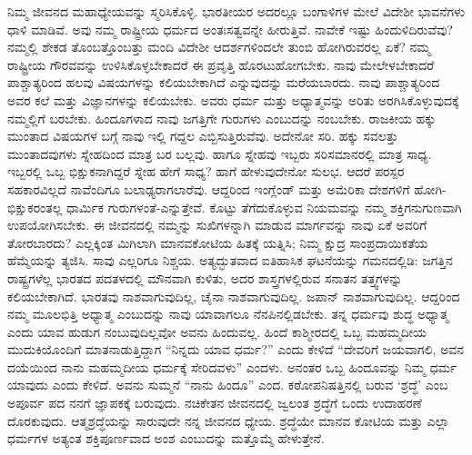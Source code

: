 ನಿಮ್ಮ ಜೀವನದ ಮಹಾಧ್ಯೇಯವನ್ನು ಸ್ಮರಿಸಿಕೊಳ್ಳಿ. ಭಾರತೀಯರ ಅದರಲ್ಲೂ ಬಂಗಾಳಿಗಳ ಮೇಲೆ ವಿದೇಶೀ ಭಾವನೆಗಳು ಧಾಳಿ ಮಾಡಿವೆ. ಅವು ನಮ್ಮ ರಾಷ್ಟ್ರೀಯ ಧರ್ಮದ ಅಂತಃಸತ್ವವನ್ನೇ ಹೀರುತ್ತಿವೆ. ನಾವೇಕೆ ಇಷ್ಟು ಹಿಂದುಳಿದಿರುವೆವು? ನಮ್ಮಲ್ಲಿ ಶೇಕಡ ತೊಂಬತ್ತೊಂಬತ್ತು ಮಂದಿ ವಿದೇಶೀ ಆದರ್ಶಗಳಿಂದಲೇ ತುಂಬಿ ಹೋಗಿರುವರಲ್ಲ ಏಕೆ? ನಮ್ಮ ರಾಷ್ಟ್ರೀಯ ಗೌರವವನ್ನು ಉಳಿಸಿಕೊಳ್ಳಬೇಕಾದರೆ ಈ ಪ್ರವೃತ್ತಿ ಹೊರಟುಹೋಗಬೇಕು. ನಾವು ಮೇಲೇಳಬೇಕಾದರೆ ಪಾಶ್ಚಾತ್ಯರಿಂದ ಹಲವು ವಿಷಯಗಳನ್ನು ಕಲಿಯಬೇಕಾಗಿದೆ ಎನ್ನುವುದನ್ನು ಮರೆಯಬಾರದು. ನಾವು ಪಾಶ್ಚಾತ್ಯರಿಂದ ಅವರ ಕಲೆ ಮತ್ತು ವಿಜ್ಞಾನಗಳನ್ನು ಕಲಿಯಬೇಕು. ಅವರು ಧರ್ಮ ಮತ್ತು ಅಧ್ಯಾತ್ಮವನ್ನು ಅರಿತು ಅರಗಿಸಿಕೊಳ್ಳುವುದಕ್ಕೆ ನಮ್ಮಲ್ಲಿಗೆ ಬರಬೇಕು. ಹಿಂದೂಗಳಾದ ನಾವು ಜಗತ್ತಿಗೇ ಗುರುಗಳು ಎಂಬುದನ್ನು ನಂಬಬೇಕು. ರಾಜಕೀಯ ಹಕ್ಕು ಮುಂತಾದ ವಿಷಯಗಳ ಬಗ್ಗೆ ನಾವು ಇಲ್ಲಿ ಗದ್ದಲ ಎಬ್ಬಿಸುತ್ತಿರುವೆವು. ಅದೇನೋ ಸರಿ. ಹಕ್ಕು ಸವಲತ್ತು ಮುಂತಾದವುಗಳು ಸ್ನೇಹದಿಂದ ಮಾತ್ರ ಬರ ಬಲ್ಲವು. ಹಾಗೂ ಸ್ನೇಹವು ಇಬ್ಬರು ಸರಿಸಮಾನರಲ್ಲಿ ಮಾತ್ರ ಸಾಧ್ಯ. ಇಬ್ಬರಲ್ಲಿ ಒಬ್ಬ ಭಿಕ್ಷುಕನಾಗಿದ್ದರೆ ಸ್ನೇಹ ಹೇಗೆ ಸಾಧ್ಯ? ಹಾಗೆ ಹೇಳುವುದೇನೋ ಸುಲಭ. ಆದರೆ ಪರಸ್ಪರ ಸಹಕಾರವಿಲ್ಲದೆ ನಾವೆಂದಿಗೂ ಬಲಾಢ್ಯರಾಗಲಾರೆವು. ಆದ್ದರಿಂದ ಇಂಗ್ಲೆಂಡ್​ ಮತ್ತು ಅಮೆರಿಕಾ ದೇಶಗಳಿಗೆ ಹೋಗಿ-ಭಿಕ್ಷುಕರಂತಲ್ಲ ಧಾರ್ಮಿಕ ಗುರುಗಳಂತೆ-ಎನ್ನುತ್ತೇವೆ. ಕೊಟ್ಟು ತೆಗೆದುಕೊಳ್ಳುವ ನಿಯಮವನ್ನು ನಮ್ಮ ಶಕ್ತಿಗನುಗುಣವಾಗಿ ಉಪಯೋಗಿಸಬೇಕು. ಈ ಜೀವನದಲ್ಲಿ ನಮ್ಮನ್ನು ಸುಖಿಗಳನ್ನಾಗಿ ಮಾಡುವ ಮಾರ್ಗವನ್ನು ನಾವು ಏಕೆ ಅವರಿಗೆ ತೋರಬಾರದು? ಎಲ್ಲಕ್ಕಿಂತ ಮಿಗಿಲಾಗಿ ಮಾನವಕೋಟಿಯ ಹಿತಕ್ಕೆ ಯತ್ನಿಸಿ; ನಿಮ್ಮ ಕ್ಷುದ್ರ ಸಾಂಪ್ರದಾಯಿಕತೆಯ ಹೆಮ್ಮೆಯನ್ನು ತ್ಯಜಿಸಿ. ಸಾವು ಎಲ್ಲರಿಗೂ ನಿಶ್ಚಯ. ಅತ್ಯದ್ಭುತವಾದ ಐತಿಹಾಸಿಕ ಘಟನೆಯನ್ನು ಗಮನದಲ್ಲಿಡಿ: ಜಗತ್ತಿನ ರಾಷ್ಟ್ರಗಳೆಲ್ಲ ಭಾರತದ ಪದತಳದಲ್ಲಿ ಮೌನವಾಗಿ ಕುಳಿತು, ಅದರ ಶಾಸ್ತ್ರಗಳಲ್ಲಿರುವ ಸನಾತನ ತತ್ತ್ವಗಳನ್ನು ಕಲಿಯಬೇಕಾಗಿದೆ. ಭಾರತವು ನಾಶವಾಗುವುದಿಲ್ಲ, ಚೈನಾ ನಾಶವಾಗುವುದಿಲ್ಲ. ಜಪಾನ್​ ನಾಶವಾಗುವುದಿಲ್ಲ. ಆದ್ದರಿಂದ ನಮ್ಮ ಮೂಲಭಿತ್ತಿ ಅಧ್ಯಾತ್ಮ ಎಂಬುದನ್ನು ನಾವು ಯಾವಾಗಲೂ ನೆನಪಿನಲ್ಲಿಡಬೇಕು. ತನ್ನ ಧರ್ಮವು ಶುದ್ಧ ಅಧ್ಯಾತ್ಮ ಎಂದು ಯಾವ ಹುಡುಗ ನಂಬುವುದಿಲ್ಲವೋ ಅವನು ಹಿಂದುವಲ್ಲ. ಹಿಂದೆ ಕಾಶ್ಮೀರದಲ್ಲಿ ಒಬ್ಬ ಮಹಮ್ಮದೀಯ ಮುದುಕಿಯೊಂದಿಗೆ ಮಾತನಾಡುತ್ತಿದ್ದಾಗ “ನಿನ್ನದು ಯಾವ ಧರ್ಮ?” ಎಂದು ಕೇಳಿದೆ “ದೇವರಿಗೆ ಜಯವಾಗಲಿ, ಅವನ ದಯೆಯಿಂದ ನಾನು ಮಹಮ್ಮದೀಯ ಧರ್ಮಕ್ಕೆ ಸೇರಿದವಳು” ಎಂದಳು. ಅನಂತರ ಒಬ್ಬ ಹಿಂದೂವನ್ನು ನಿಮ್ಮ ಧರ್ಮ ಯಾವುದು ಎಂದು ಕೇಳಿದೆ. ಅವನು ಸುಮ್ಮನೆ “ನಾನು ಹಿಂದೂ” ಎಂದ. ಕಠೋಪನಿಷತ್ತಿನಲ್ಲಿ ಬರುವ ‘ಶ್ರದ್ಧೆ’ ಎಂಬ ಅಪೂರ್ವ ಪದ ನನಗೆ ಜ್ಞಾಪಕಕ್ಕೆ ಬರುವುದು. ನಚಿಕೇತನ ಜೀವನದಲ್ಲಿ ಜ್ವಲಂತ ಶ್ರದ್ಧೆಗೆ ಒಂದು ಉದಾಹರಣೆ ದೊರಕುವುದು. ಆತ್ಮಶ್ರದ್ಧೆಯನ್ನು ಸಾರುವುದೇ ನನ್ನ ಜೀವನದ ಧ್ಯೇಯ. ಶ್ರದ್ಧೆಯೇ ಮಾನವ ಕೋಟಿಯ ಮತ್ತು ಎಲ್ಲಾ ಧರ್ಮಗಳ ಅತ್ಯಂತ ಶಕ್ತಿಪೂರ್ಣವಾದ ಅಂಶ ಎಂಬುದನ್ನು ಮತ್ತೊಮ್ಮೆ ಹೇಳುತ್ತೇನೆ.

\vskip 8pt

